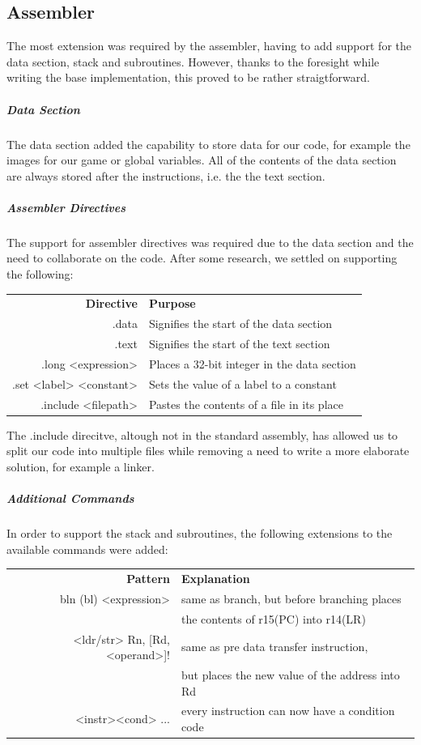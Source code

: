 \documentclass[11pt]{article}
\begin{document}
\subsection*{Assembler}
The most extension was required by the assembler, having to add support for the data section, stack and subroutines. However, thanks to the foresight while writing the base implementation, this proved to be rather straigtforward.
\subparagraph*{Data Section}
The data section added the capability to store data for our code, for example the images for our game or global variables. All of the contents of the data section are always stored after the instructions, i.e. the the text section.
\subparagraph*{Assembler Directives} The support for assembler directives was required due to the data section and the need to collaborate on the code. After some research, we settled on supporting the following:
\begin{center}
	\begin{tabular}{r|l}
		\textbf{Directive} & \textbf{Purpose} \\
		.data & Signifies the start of the data section \\
		.text & Signifies the start of the text section \\
		.long <expression> & Places a 32-bit integer in the data section \\
		.set <label> <constant> & Sets the value of a label to a constant \\
		.include <filepath> & Pastes the contents of a file in its place
	\end{tabular}
\end{center}
The .include direcitve, altough not in the standard assembly, has allowed us to split our code into multiple files while removing a need to write a more elaborate solution, for example a linker.
\subparagraph*{Additional Commands}
In order to support the stack and subroutines, the following extensions to the available commands were added:
\begin{center}
	\begin{tabular}{r|l}
		\textbf{Pattern} & \textbf{Explanation} \\
		bln (bl) <expression> & same as branch, but before branching places \\
		                      & the contents of r15(PC) into r14(LR) \\
		<ldr/str> Rn, [Rd, <operand>]! & same as pre data transfer instruction, \\
		                               & but places the new value of the address into Rd \\
		<instr><cond> ... & every instruction can now have a condition code
	\end{tabular}
\end{center}
\end{document}

